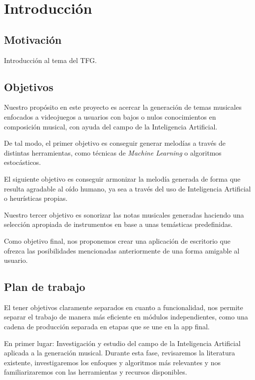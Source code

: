 \chapter{Introducción}
\label{cap:introduccion}



\section{Motivación}
Introducción al tema del TFG.


\section{Objetivos}
 Nuestro propósito en este proyecto es acercar la generación de temas musicales enfocados a videojuegos a usuarios con bajos o nulos conocimientos en composición musical, con ayuda del campo de la Inteligencia Artificial.
 
 De tal modo, el primer objetivo es conseguir generar melodías a través de distintas herramientas, como técnicas de \textit{Machine Learning} o algoritmos estocásticos.
 
 El siguiente objetivo es conseguir armonizar la melodía generada de forma que resulta agradable al oído humano, ya sea a través del uso de Inteligencia Artificial o heurísticas propias.
 
 Nuestro tercer objetivo es sonorizar las notas musicales generadas haciendo una selección apropiada de instrumentos en base a unas temásticas predefinidas.
 
 Como objetivo final, nos proponemos crear una aplicación de escritorio que ofrezca las posibilidades mencionadas anteriormente de una forma amigable al usuario.

\section{Plan de trabajo}
El tener objetivos claramente separados en cuanto a funcionalidad, nos permite separar el trabajo de manera más eficiente en módulos independientes, como una cadena de producción separada en etapas que se une en la app final. 

En primer lugar: Investigación y estudio del campo de la Inteligencia Artificial aplicada a la generación musical. Durante esta fase, revisaremos la literatura existente, investigaremos los enfoques y algoritmos más relevantes y nos familiarizaremos con las herramientas y recursos disponibles.

